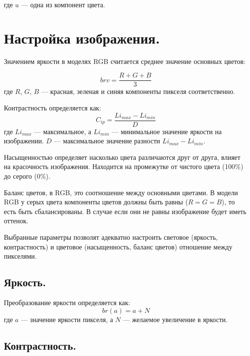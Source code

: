 где $u$ --- одна из компонент цвета. \cite{ppspec}

\section{Настройка изображения.}

Значением яркости в моделях RGB считается среднее значение основных цветов:

\begin{equation}
	\label{br}
	brv = \frac{R + G + B}{3}
\end{equation}
где $R$, $G$, $B$ --- красная, зеленая и синяя компоненты пикселя соответственно. \cite{colorfaq}

Контрастность определяется как:
\begin{equation}
	\label{condef}
	C_{ip} = \frac{Li_{max} - Li_{min}}{D}
\end{equation}
где $Li_{max}$ --- максимальное, а $Li_{min}$ --- минимальное значение яркости на изображении. $D$ --- максимальное значение разности $Li_{max} - Li_{min}$. \cite{contrastdef}

Насыщенностью определяет насколько цвета различаются друг от друга, влияет на красочность изображения. Находится на промежутке от чистого цвета (100\%) до серого (0\%). \cite{satdef}

Баланс цветов, в RGB, это соотношение между основными цветами. В модели RGB у серых цвета компоненты цветов должны быть равны ($R = G = B$), то есть быть сбалансированы. В случае если они не равны изображение будет иметь оттенок.\cite{colorb}

Выбранные параметры позволят адекватно настроить световое (яркость, контрастность) и цветовое (насыщенность, баланс цветов) отношение между пикселями. 

\subsection{Яркость.}

Преобразование яркости определяется как:
\begin{equation}
	\label{brightness}
	br(a) = a + N
\end{equation}
где $a$ --- значение яркости пикселя, а $N$ --- желаемое увеличение в яркости. \cite{brk}


\subsection{Контрастность.}

